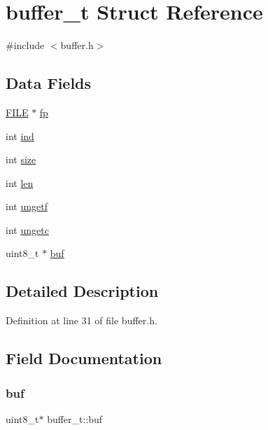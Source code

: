 \hypertarget{structbuffer__t}{}\section{buffer\+\_\+t Struct Reference}
\label{structbuffer__t}


{\ttfamily \#include $<$buffer.\+h$>$}

\subsection*{Data Fields}
\begin{DoxyCompactItemize}
\item 
\hyperlink{posix_8h_aed4dabeb9f7c518ded42f930a04abce8}{F\+I\+LE} $\ast$ \hyperlink{structbuffer__t_a00a55014e0827223c41b1b1d56e5be5d}{fp}
\item 
int \hyperlink{structbuffer__t_a59ea992e5006ead050862bae5c41670a}{ind}
\item 
int \hyperlink{structbuffer__t_a34e81d898c6accf4f06ed9c1133d6361}{size}
\item 
int \hyperlink{structbuffer__t_a0b67fc6880d331ae05dab0e58a4584c2}{len}
\item 
int \hyperlink{structbuffer__t_a67c2edddeca1858c670ff57e049a9e0e}{ungetf}
\item 
int \hyperlink{structbuffer__t_aa1fbbf42ce5d6278b21a93647bef3ff1}{ungetc}
\item 
uint8\+\_\+t $\ast$ \hyperlink{structbuffer__t_ab98e4f2d4fe10a680089d291ef1907c7}{buf}
\end{DoxyCompactItemize}


\subsection{Detailed Description}


Definition at line 31 of file buffer.\+h.



\subsection{Field Documentation}
\mbox{\label{structbuffer__t_ab98e4f2d4fe10a680089d291ef1907c7}} 
\subsubsection{\texorpdfstring{buf}{buf}}
{\footnotesize\ttfamily uint8\+\_\+t$\ast$ buffer\+\_\+t\+::buf}




